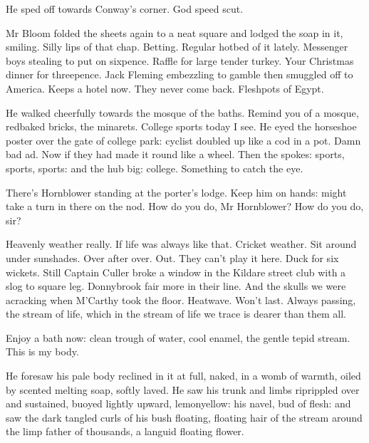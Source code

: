 He sped off towards Conway's corner. God speed scut.

Mr Bloom folded the sheets again to a neat square and lodged the
soap in it, smiling. Silly lips of that chap. Betting. Regular hotbed of
it lately. Messenger boys stealing to put on sixpence. Raffle for large
tender turkey. Your Christmas dinner for threepence. Jack Fleming
embezzling to gamble then smuggled off to America. Keeps a hotel now. They
never come back. Fleshpots of Egypt.

He walked cheerfully towards the mosque of the baths. Remind you
of a mosque, redbaked bricks, the minarets. College sports today I see. He
eyed the horseshoe poster over the gate of college park: cyclist doubled
up like a cod in a pot. Damn bad ad. Now if they had made it round like a
wheel. Then the spokes: sports, sports, sports: and the hub big: college.
Something to catch the eye.

There's Hornblower standing at the porter's lodge. Keep him on
hands: might take a turn in there on the nod. How do you do, Mr
Hornblower? How do you do, sir?

Heavenly weather really. If life was always like that. Cricket weather.
Sit around under sunshades. Over after over. Out. They can't play it here.
Duck for six wickets. Still Captain Culler broke a window in the Kildare
street club with a slog to square leg. Donnybrook fair more in their line.
And the skulls we were acracking when M'Carthy took the floor.
Heatwave. Won't last. Always passing, the stream of life, which in the
stream of life we trace is dearer than them all.

Enjoy a bath now: clean trough of water, cool enamel, the gentle
tepid stream. This is my body.

He foresaw his pale body reclined in it at full, naked, in a womb of
warmth, oiled by scented melting soap, softly laved. He saw his trunk and
limbs riprippled over and sustained, buoyed lightly upward, lemonyellow:
his navel, bud of flesh: and saw the dark tangled curls of his bush
floating, floating hair of the stream around the limp father of thousands,
a languid floating flower.


